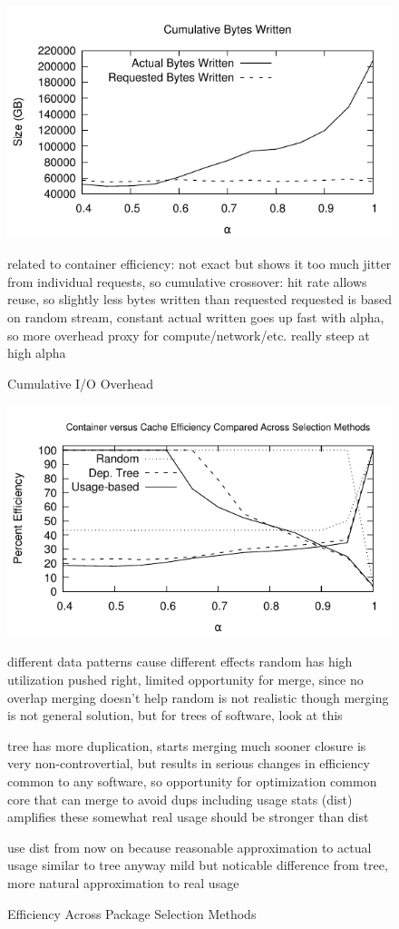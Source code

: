 \documentclass[sigconf]{acmart}
\begin{document}
\begin{figure}
\includegraphics[width=\linewidth]{curated/comparative/container_efficiency.pdf}
\caption{Cumulative I/O Overhead}
\label{fig:container-eff}
related to container efficiency: not exact but shows it
too much jitter from individual requests, so cumulative
crossover: hit rate allows reuse, so slightly less bytes written than requested
requested is based on random stream, constant
actual written goes up fast with alpha, so more overhead
proxy for compute/network/etc.
really steep at high alpha
\fi
\end{figure}


\begin{figure}
\includegraphics[width=\linewidth]{curated/comparative/distribution_efficiency_comp.pdf}
\caption{Efficiency Across Package Selection Methods}
\label{fig:comp-eff}
different data patterns cause different effects
random has high utilization
pushed right, limited opportunity for merge, since no overlap
merging doesn't help
random is not realistic though
merging is not general solution, but for trees of software, look at this

tree has more duplication, starts merging much sooner
closure is very non-controvertial, but results in serious changes in efficiency
common to any software, so opportunity for optimization
common core that can merge to avoid dups
including usage stats (dist) amplifies these somewhat
real usage should be stronger than dist

use dist from now on because reasonable approximation to actual usage
similar to tree anyway
mild but noticable difference from tree, more natural approximation to real usage
\fi
\end{figure}
\end{document}
